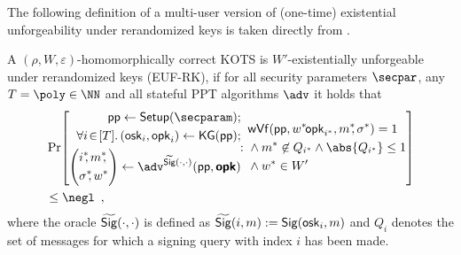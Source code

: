 The following definition of a multi-user version of (one-time) existential unforgeability under rerandomized keys is taken directly from \cite{CCS:FleSimZha22}.

\begin{definition}
  A $(\rho,W,\varepsilon)$-homomorphically correct KOTS is $W'$-existentially unforgeable under rerandomized keys (EUF-RK), if for all security parameters $\secpar$, any $T=\poly\in\NN$ and all stateful PPT algorithms $\adv$ it holds that
  \[
    \begin{aligned}
    &\Pr\mleft[
      \begin{aligned}
      \params \gets \setup(\secparam);\\
      \forall i \!\in\! [T]\ldotp (\osk_i,\opk_i) \gets \kgen(\params);\\
      \mleft(
      \begin{aligned}
      &i^*\!\!,m^*\!\!,\\&\sigma^*\!\!,w^*
      \end{aligned}
      \mright) 
      \gets \adv^{\widetilde\sign(\cdot,\cdot)}(\params,\vec{\opk})\\
      \end{aligned}\!\colon\!
      \begin{aligned}
      &\wverify(\params,w^{*\!}\opk_{i^*},m^*\!\!,\sigma^*) = 1\\
      &\land m^*\not\in Q_{i^*} \land \abs{Q_{i^*}}\leq 1\\
      &\land w^* \in W'
      \end{aligned}
    \mright]\\
    &\leq \negl\enspace,
    \end{aligned}
  \]
  where the oracle $\widetilde{\mathsf{Sig}}(\cdot,\cdot)$ is defined as $\widetilde{\mathsf{Sig}}(i,m) := \mathsf{Sig}(\mathsf{osk}_i,m)$ and $Q_i$ denotes the set of messages for which a signing query with index $i$ has been made.
\end{definition}

